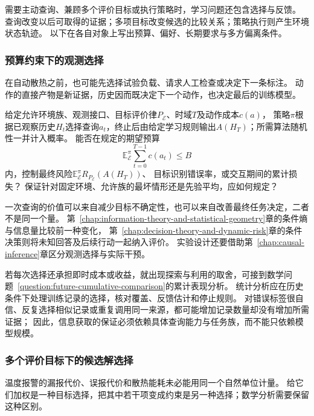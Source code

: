 需要主动查询、兼顾多个评价目标或执行策略时，学习问题还包含选择与反馈。
查询改变以后可取得的证据；多项目标改变候选的比较关系；策略执行则产生环境状态轨迹。
以下在各自对象上写出预算、偏好、长期要求与多方偏离条件。

\subsubsection{预算约束下的观测选择}
\label{sec:future-analysis-information-acquisition}

在自动散热之前，也可能先选择试验负载、请求人工检查或决定下一条标注。
动作的直接产物是新证据，历史因而既决定下一个动作，也决定最后的训练模型。

\begin{mathproblem}[观测选择策略的信息收益与代价]
  \label{question:future-information-acquisition}
  给定允许环境族、观测接口、目标评价律$P_{\mathcal E}$、时域$T$及动作成本$c(a)$，
  策略$\pi$根据已观察历史$H_t$选择查询$a_t$，终止后由给定学习规则输出$A(H_T)$；所需算法随机性一并计入概率。
  能否在规定的期望预算
  \[
    \mathbb E_{\mathcal E}^{\pi}\sum_{t=0}^{T-1}c(a_t)\leq B
  \]
  内，控制最终风险$\mathbb E_{\mathcal E}^{\pi}R_{P_{\mathcal E}}(A(H_T))$、
  目标识别错误率，或交互期间的累计损失？
  保证针对固定环境、允许族的最坏情形还是先验平均，应如何规定？
\end{mathproblem}

一次查询的价值可以来自减少目标不确定性，也可以来自改善最终任务决定，二者不是同一个量。
第~\ref{chap:information-theory-and-statistical-geometry}章的条件熵与信息量比较前一种变化，
第~\ref{chap:decision-theory-and-dynamic-risk}章的条件决策则将未知回答及后续行动一起纳入评价。
实验设计还要借助第~\ref{chap:causal-inference}章区分观测选择与实际干预。

若每次选择还承担即时成本或收益，就出现探索与利用的取舍，可接到数学问题~\ref{question:future-cumulative-comparison}的累计表现分析。
统计分析应在历史条件下处理训练记录的选择，核对覆盖、反馈估计和停止规则。
对错误标签很自信、反复选择相似记录或重复调用同一来源，都可能增加记录数量却没有增加所需证据；
因此，信息获取的保证必须依赖具体查询能力与任务族，而不能只依赖模型规模。

\subsubsection{多个评价目标下的候选解选择}
\label{sec:future-analysis-multiple-objectives}

温度报警的漏报代价、误报代价和散热能耗未必能用同一个自然单位计量。
给它们加权是一种目标选择，把其中若干项变成约束是另一种选择；数学分析需要保留这种区别。

